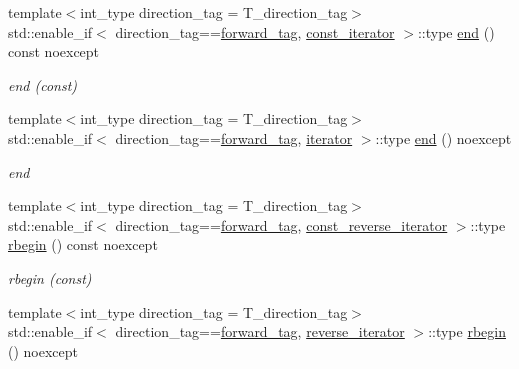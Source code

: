\begin{DoxyCompactItemize}
{\footnotesize template$<$int\+\_\+type direction\+\_\+tag = T\+\_\+direction\+\_\+tag$>$ }\\std\+::enable\+\_\+if$<$ direction\+\_\+tag==\hyperlink{namespaceIceBRG_a3f2c2517005b9902e3eb97894b072f91ac4e94566c20918ca2fe2c7ccdfdec928}{forward\+\_\+tag}, \hyperlink{classIceBRG_1_1labeled__array__vecs_a6003abed56d6f931ce74524cda329972}{const\+\_\+iterator} $>$\+::type \hyperlink{classIceBRG_1_1labeled__array__vecs_ac9f9dbf3e4dcf8f73273257ef1d6a088}{end} () const  noexcept
\begin{DoxyCompactList}\small\item\em end (const) \end{DoxyCompactList}\item 
{\footnotesize template$<$int\+\_\+type direction\+\_\+tag = T\+\_\+direction\+\_\+tag$>$ }\\std\+::enable\+\_\+if$<$ direction\+\_\+tag==\hyperlink{namespaceIceBRG_a3f2c2517005b9902e3eb97894b072f91ac4e94566c20918ca2fe2c7ccdfdec928}{forward\+\_\+tag}, \hyperlink{classIceBRG_1_1labeled__array__vecs_a989cbe0a7bc0b96a206c52ddd3513a23}{iterator} $>$\+::type \hyperlink{classIceBRG_1_1labeled__array__vecs_a6f3a2fe9cd8a98935622c092520251a9}{end} () noexcept
\begin{DoxyCompactList}\small\item\em end \end{DoxyCompactList}\item 
{\footnotesize template$<$int\+\_\+type direction\+\_\+tag = T\+\_\+direction\+\_\+tag$>$ }\\std\+::enable\+\_\+if$<$ direction\+\_\+tag==\hyperlink{namespaceIceBRG_a3f2c2517005b9902e3eb97894b072f91ac4e94566c20918ca2fe2c7ccdfdec928}{forward\+\_\+tag}, \hyperlink{classIceBRG_1_1labeled__array__vecs_aefecf82bcd5d24b2c6fc29b4f8930054}{const\+\_\+reverse\+\_\+iterator} $>$\+::type \hyperlink{classIceBRG_1_1labeled__array__vecs_a807f22042b0a4ccfcdc97070dcca575f}{rbegin} () const  noexcept
\begin{DoxyCompactList}\small\item\em rbegin (const) \end{DoxyCompactList}\item 
{\footnotesize template$<$int\+\_\+type direction\+\_\+tag = T\+\_\+direction\+\_\+tag$>$ }\\std\+::enable\+\_\+if$<$ direction\+\_\+tag==\hyperlink{namespaceIceBRG_a3f2c2517005b9902e3eb97894b072f91ac4e94566c20918ca2fe2c7ccdfdec928}{forward\+\_\+tag}, \hyperlink{classIceBRG_1_1labeled__array__vecs_ab3d90428e6ba03e8a3bcb3b44629e3f5}{reverse\+\_\+iterator} $>$\+::type \hyperlink{classIceBRG_1_1labeled__array__vecs_ac891b09def145b0b3ea31d52fc328307}{rbegin} () noexcept

\end{DoxyCompactItemize}
